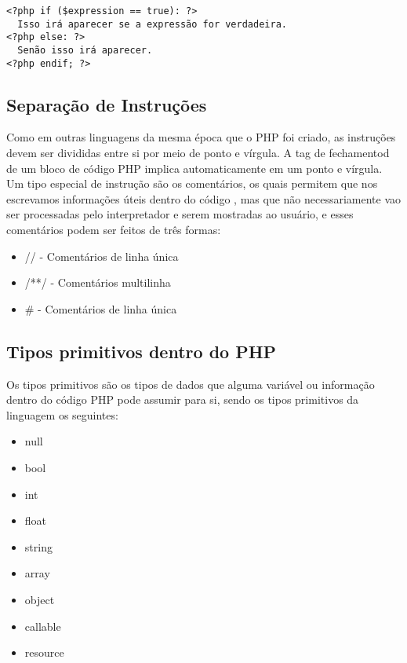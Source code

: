 \documentclass[12pt a4paper]{paper}
\begin{document}
\begin{verbatim}
<?php if ($expression == true): ?>
  Isso irá aparecer se a expressão for verdadeira.
<?php else: ?>
  Senão isso irá aparecer.
<?php endif; ?>
\end{verbatim}


\subsection{Separação de Instruções}
Como em outras linguagens da mesma época que o PHP foi criado, as instruções devem ser divididas entre si por meio de 
ponto e vírgula. A tag de fechamentod de um bloco de código PHP implica automaticamente em um ponto e vírgula.
Um tipo especial de instrução são os comentários, os quais permitem que nos escrevamos informações úteis dentro do código
, mas que não necessariamente vao ser processadas pelo interpretador e serem mostradas ao usuário, e esses comentários 
podem ser feitos de três formas:

\begin{itemize}
    \item // - Comentários de linha única
    \item /**/ - Comentários multilinha
    \item \# - Comentários de linha única
\end{itemize}

\subsection{Tipos primitivos dentro do PHP}
Os tipos primitivos são os tipos de dados que alguma variável ou informação dentro do código PHP pode assumir para si, 
sendo os tipos primitivos da linguagem os seguintes:


\begin{multicols}{3}
\begin{itemize}
    \item null
    \item bool
    \item int
    \item float
    \item string
    \item array
    \item object
    \item callable
    \item resource
\end{itemize}
\end{multicols}
\end{document}

